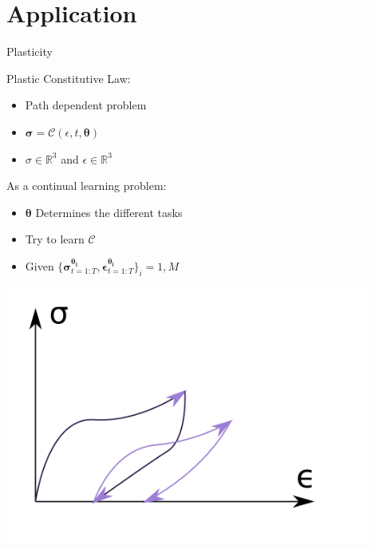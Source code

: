 \documentclass[aspectratio=169]{beamer}
\begin{document}
\section{Application}
\begin{frame}{Plasticity}
  \begin{minipage}{0.5\textwidth}
    {
      Plastic Constitutive Law:
      \begin{itemize}
        \item Path dependent problem
        \item $\boldsymbol{\sigma}=\mathcal{C}(\epsilon, t, \boldsymbol{\theta})$
        \item $\sigma\in\mathbb{R}^3$ and $\epsilon\in\mathbb{R}^3$
      \end{itemize}
    }
    {
      As a continual learning problem:
      \begin{itemize}
        \item $\boldsymbol{\theta}$ Determines the different tasks
        \item Try to learn $\mathcal{C}$
        \item Given $\{\boldsymbol{\sigma}^{\boldsymbol{\theta_i}}_{t=1:T},\boldsymbol{\epsilon}^{\boldsymbol{\theta_i}}_{t=1:T}\}_i=1,M$
      \end{itemize}
    }
  \end{minipage}%
  \begin{minipage}{0.5\textwidth}
    \centering
    \includegraphics[width=0.9\textwidth]{figures/plastic.pdf}
  \end{minipage}
\end{frame}
\end{document}
